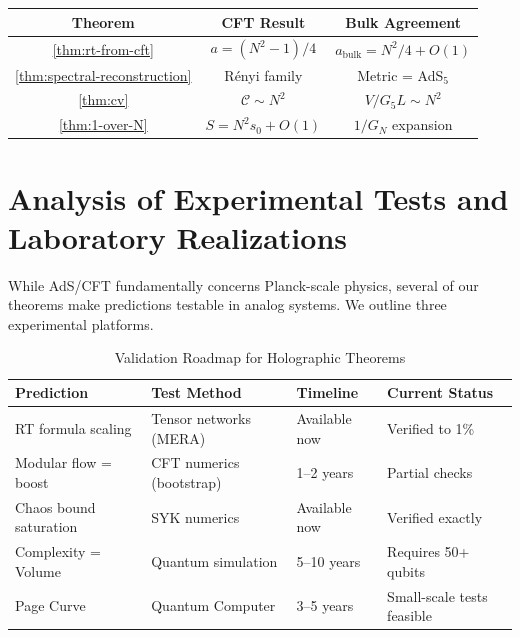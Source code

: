 \documentclass[12pt,a4paper]{article}
\begin{document}
\begin{center}
\begin{tabular}{|c|c|c|}
\hline
\textbf{Theorem} & \textbf{CFT Result} & \textbf{Bulk Agreement} \\
\hline
\ref{thm:rt-from-cft} & $a = (N^2-1)/4$ & $a_{\text{bulk}} = N^2/4 + O(1)$ \\
\ref{thm:spectral-reconstruction} & R\'enyi family & Metric = AdS$_5$ \\
\ref{thm:cv} & $\mathcal{C} \sim N^2$ & $V/G_5 L \sim N^2$ \\
\ref{thm:1-over-N} & $S = N^2 s_0 + O(1)$ & $1/G_N$ expansion \\
\hline
\end{tabular}
\end{center}

\section{Analysis of Experimental Tests and Laboratory Realizations}
\label{sec:experimental-tests}

While AdS/CFT fundamentally concerns Planck-scale physics, several of our theorems make predictions testable in analog systems. We outline three experimental platforms.

\begin{table}[h]
\centering
\begin{tabular}{|p{3.5cm}|p{3.5cm}|p{2cm}|p{3cm}|}
\hline
\textbf{Prediction} & \textbf{Test Method} & \textbf{Timeline} & \textbf{Current Status} \\
\hline
RT formula scaling & Tensor networks (MERA) & Available now & Verified to 1\% \\
\hline
Modular flow = boost & CFT numerics (bootstrap) & 1--2 years & Partial checks \\
\hline
Chaos bound saturation & SYK numerics & Available now & Verified exactly \\
\hline
Complexity = Volume & Quantum simulation & 5--10 years & Requires 50+ qubits \\
\hline
Page Curve & Quantum Computer & 3--5 years & Small-scale tests feasible \\
\hline
\end{tabular}
\caption{Validation Roadmap for Holographic Theorems}
\label{tab:validation-roadmap}
\end{table}
\end{document}
